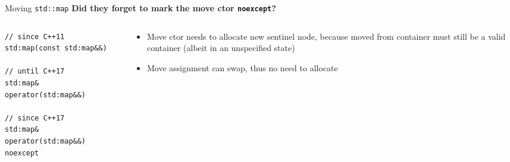 \documentclass[compress,aspectratio=1610]{beamer}
\begin{document}
\begin{frame}[fragile]{Moving \texttt{std::map}}
    \textbf{Did they forget to mark the move ctor \texttt{noexcept}?} 

    \begin{columns}[t]
        \begin{column}{.45\textwidth}
            \begin{lstlisting}[numbers=none]
// since C++11
std:map(const std:map&&)

// until C++17
std:map& operator(std:map&&)

// since C++17
std:map& operator(std:map&&) noexcept
            \end{lstlisting}
        \end{column}
        \begin{column}{.5\textwidth}
            \begin{itemize}
                \item<2> Move ctor needs to allocate new sentinel node, because moved from container must still be a valid container (albeit in an unspecified state)
                \item<2> Move assignment can swap, thus no need to allocate
            \end{itemize}
        \end{column}
    \end{columns}

\end{frame}
\end{document}
